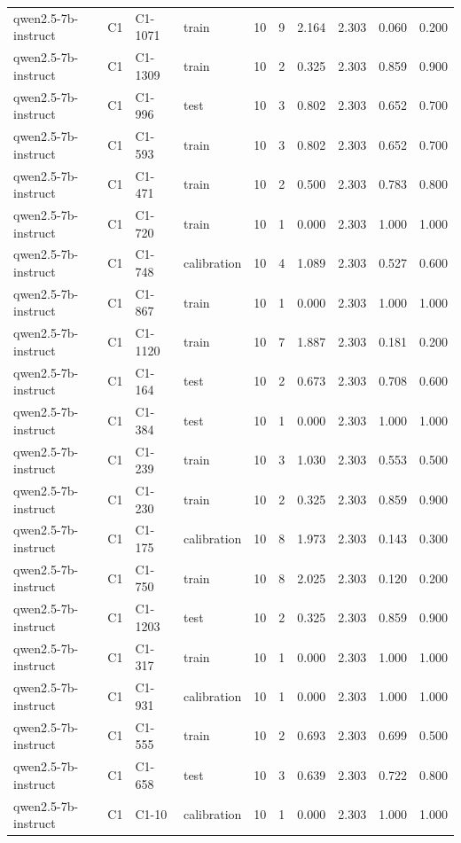 \begin{table}
\begin{tabular}{llllrrrrrr}
qwen2.5-7b-instruct & C1 & C1-1071 & train & 10 & 9 & 2.164 & 2.303 & 0.060 & 0.200 \\
qwen2.5-7b-instruct & C1 & C1-1309 & train & 10 & 2 & 0.325 & 2.303 & 0.859 & 0.900 \\
qwen2.5-7b-instruct & C1 & C1-996 & test & 10 & 3 & 0.802 & 2.303 & 0.652 & 0.700 \\
qwen2.5-7b-instruct & C1 & C1-593 & train & 10 & 3 & 0.802 & 2.303 & 0.652 & 0.700 \\
qwen2.5-7b-instruct & C1 & C1-471 & train & 10 & 2 & 0.500 & 2.303 & 0.783 & 0.800 \\
qwen2.5-7b-instruct & C1 & C1-720 & train & 10 & 1 & 0.000 & 2.303 & 1.000 & 1.000 \\
qwen2.5-7b-instruct & C1 & C1-748 & calibration & 10 & 4 & 1.089 & 2.303 & 0.527 & 0.600 \\
qwen2.5-7b-instruct & C1 & C1-867 & train & 10 & 1 & 0.000 & 2.303 & 1.000 & 1.000 \\
qwen2.5-7b-instruct & C1 & C1-1120 & train & 10 & 7 & 1.887 & 2.303 & 0.181 & 0.200 \\
qwen2.5-7b-instruct & C1 & C1-164 & test & 10 & 2 & 0.673 & 2.303 & 0.708 & 0.600 \\
qwen2.5-7b-instruct & C1 & C1-384 & test & 10 & 1 & 0.000 & 2.303 & 1.000 & 1.000 \\
qwen2.5-7b-instruct & C1 & C1-239 & train & 10 & 3 & 1.030 & 2.303 & 0.553 & 0.500 \\
qwen2.5-7b-instruct & C1 & C1-230 & train & 10 & 2 & 0.325 & 2.303 & 0.859 & 0.900 \\
qwen2.5-7b-instruct & C1 & C1-175 & calibration & 10 & 8 & 1.973 & 2.303 & 0.143 & 0.300 \\
qwen2.5-7b-instruct & C1 & C1-750 & train & 10 & 8 & 2.025 & 2.303 & 0.120 & 0.200 \\
qwen2.5-7b-instruct & C1 & C1-1203 & test & 10 & 2 & 0.325 & 2.303 & 0.859 & 0.900 \\
qwen2.5-7b-instruct & C1 & C1-317 & train & 10 & 1 & 0.000 & 2.303 & 1.000 & 1.000 \\
qwen2.5-7b-instruct & C1 & C1-931 & calibration & 10 & 1 & 0.000 & 2.303 & 1.000 & 1.000 \\
qwen2.5-7b-instruct & C1 & C1-555 & train & 10 & 2 & 0.693 & 2.303 & 0.699 & 0.500 \\
qwen2.5-7b-instruct & C1 & C1-658 & test & 10 & 3 & 0.639 & 2.303 & 0.722 & 0.800 \\
qwen2.5-7b-instruct & C1 & C1-10 & calibration & 10 & 1 & 0.000 & 2.303 & 1.000 & 1.000 \\

\end{tabular}
\end{table}
